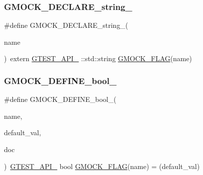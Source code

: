 \subsubsection{\texorpdfstring{GMOCK\_DECLARE\_string\_}{GMOCK\_DECLARE\_string\_}}
{\footnotesize\ttfamily \#define G\+M\+O\+C\+K\+\_\+\+D\+E\+C\+L\+A\+R\+E\+\_\+string\+\_\+(\begin{DoxyParamCaption}\item[{}]{name }\end{DoxyParamCaption})~extern \mbox{\hyperlink{_obj__test_2lib_2googletest-release-1_88_81_2googletest_2include_2gtest_2internal_2gtest-port_8h_aa73be6f0ba4a7456180a94904ce17790}{G\+T\+E\+S\+T\+\_\+\+A\+P\+I\+\_\+}} \+::std\+::string \mbox{\hyperlink{_obj__test_2lib_2googletest-release-1_88_81_2googlemock_2include_2gmock_2internal_2gmock-port_8h_ad7119adfef06be5e7b1551633f5a1436}{G\+M\+O\+C\+K\+\_\+\+F\+L\+AG}}(name)}

\mbox{\label{_obj__test_2lib_2googletest-release-1_88_81_2googlemock_2include_2gmock_2internal_2gmock-port_8h_a470be328fabbeef3987127adc18a1433}} 
\subsubsection{\texorpdfstring{GMOCK\_DEFINE\_bool\_}{GMOCK\_DEFINE\_bool\_}}
{\footnotesize\ttfamily \#define G\+M\+O\+C\+K\+\_\+\+D\+E\+F\+I\+N\+E\+\_\+bool\+\_\+(\begin{DoxyParamCaption}\item[{}]{name,  }\item[{}]{default\+\_\+val,  }\item[{}]{doc }\end{DoxyParamCaption})~\mbox{\hyperlink{_obj__test_2lib_2googletest-release-1_88_81_2googletest_2include_2gtest_2internal_2gtest-port_8h_aa73be6f0ba4a7456180a94904ce17790}{G\+T\+E\+S\+T\+\_\+\+A\+P\+I\+\_\+}} bool \mbox{\hyperlink{_obj__test_2lib_2googletest-release-1_88_81_2googlemock_2include_2gmock_2internal_2gmock-port_8h_ad7119adfef06be5e7b1551633f5a1436}{G\+M\+O\+C\+K\+\_\+\+F\+L\+AG}}(name) = (default\+\_\+val)}

\mbox{\label{_obj__test_2lib_2googletest-release-1_88_81_2googlemock_2include_2gmock_2internal_2gmock-port_8h_a19d91081ff0aaab2f60ef1dc2d6e6b34}} 
